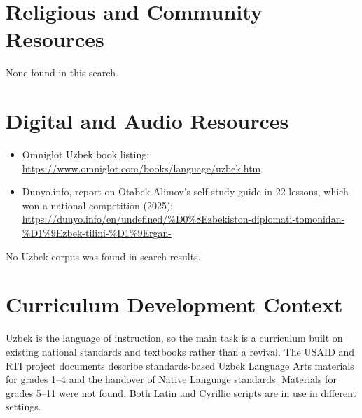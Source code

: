 \documentclass[12pt]{article}
\begin{document}
\section{Religious and Community Resources}
None found in this search.

\section{Digital and Audio Resources}
\begin{itemize}
\item Omniglot Uzbek book listing: \url{https://www.omniglot.com/books/language/uzbek.htm}
\item Dunyo.info, report on Otabek Alimov's self-study guide in 22 lessons, which won a national competition (2025): \url{https://dunyo.info/en/undefined/%D0%8Ezbekiston-diplomati-tomonidan-%D1%9Ezbek-tilini-%D1%9Ergan-}
\end{itemize}
No Uzbek corpus was found in search results.

\section{Curriculum Development Context}
Uzbek is the language of instruction, so the main task is a curriculum built on existing national standards and textbooks rather than a revival. The USAID and RTI project documents describe standards-based Uzbek Language Arts materials for grades 1--4 and the handover of Native Language standards. Materials for grades 5--11 were not found. Both Latin and Cyrillic scripts are in use in different settings.
\end{document}

